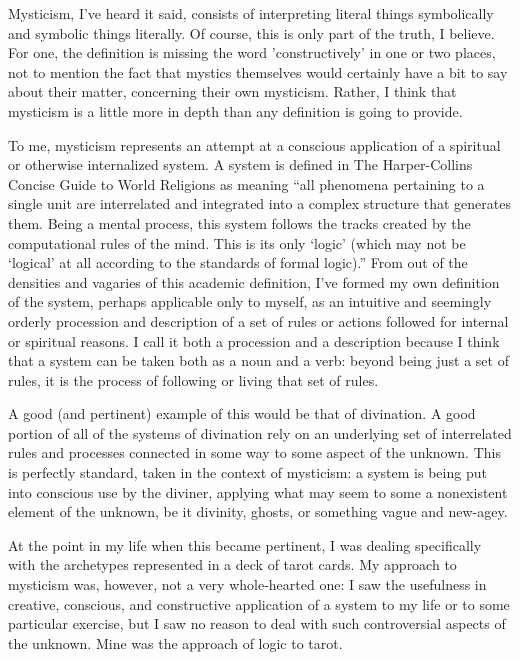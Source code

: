 \documentclass{book}
\begin{document}
Mysticism, I've heard it said, consists of interpreting literal things symbolically and symbolic things literally.  Of course, this is only part of the truth, I believe.  For one, the definition is missing the word 'constructively' in one or two places, not to mention the fact that mystics themselves would certainly have a bit to say about their matter, concerning their own mysticism.  Rather, I think that mysticism is a little more in depth than any definition is going to provide.

To me, mysticism represents an attempt at a conscious application of a spiritual or otherwise internalized system.  A system is defined in The Harper-Collins Concise Guide to World Religions as meaning ``all phenomena pertaining to a single unit are interrelated and integrated into a complex structure that generates them.  Being a mental process, this system follows the tracks created by the computational rules of the mind.  This is its only `logic' (which may not be `logical' at all according to the standards of formal logic).'' From out of the densities and vagaries of this academic definition, I've formed my own definition of the system, perhaps applicable only to myself, as an intuitive and seemingly orderly procession and description of a set of rules or actions followed for internal or spiritual reasons.  I call it both a procession and a description because I think that a system can be taken both as a noun and a verb: beyond being just a set of rules, it is the process of following or living that set of rules.

A good (and pertinent) example of this would be that of divination.  A good portion of all of the systems of divination rely on an underlying set of interrelated rules and processes connected in some way to some aspect of the unknown.  This is perfectly standard, taken in the context of mysticism: a system is being put into conscious use by the diviner, applying what may seem to some a nonexistent element of the unknown, be it divinity, ghosts, or something vague and new-agey.

At the point in my life when this became pertinent, I was dealing specifically with the archetypes represented in a deck of tarot cards.  My approach to mysticism was, however, not a very whole-hearted one: I saw the usefulness in creative, conscious, and constructive application of a system to my life or to some particular exercise, but I saw no reason to deal with such controversial aspects of the unknown.  Mine was the approach of logic to tarot.
\end{document}

